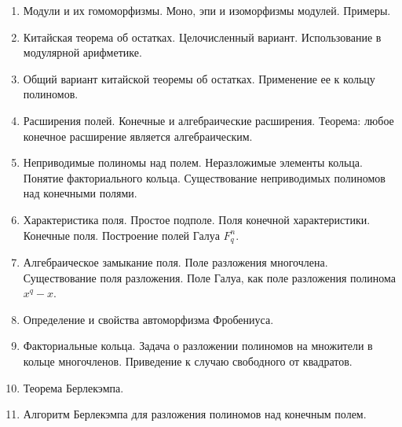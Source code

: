 \documentclass[a4paper,10pt]{article}
\begin{document}
\begin{enumerate}
  \item Модули и их гомоморфизмы.
        Моно, эпи и изоморфизмы модулей. %
        Примеры.
  \item Китайская теорема об остатках.
        Целочисленный вариант.
        Использование в модулярной арифметике.
  \item Общий вариант китайской теоремы об остатках.
        Применение ее к кольцу полиномов.
  \item Расширения полей.
        Конечные и алгебраические расширения.
        Теорема: любое конечное расширение является алгебраическим.
  \item Неприводимые полиномы над полем.
        Неразложимые элементы кольца.
        Понятие факториального кольца.
        Существование неприводимых полиномов над конечными полями.
  \item Характеристика поля.
        Простое подполе.
        Поля конечной характеристики.
        Конечные поля.
        Построение полей Галуа $F_q^n$.
  \item Алгебраическое замыкание поля.
        Поле разложения многочлена.
        Существование поля разложения.
        Поле Галуа, как поле разложения полинома $x^q-x$.
  \item Определение и свойства автоморфизма Фробениуса.
  \item Факториальные кольца.
        Задача о разложении полиномов на множители в кольце многочленов.
        Приведение к случаю свободного от квадратов.
  \item Теорема Берлекэмпа.
  \item Алгоритм Берлекэмпа для разложения полиномов над конечным полем.

\end{enumerate}
\end{document}
